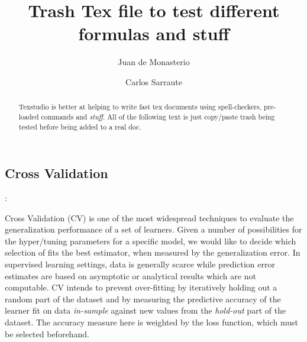 \documentclass{article}%
\theoremstyle{definition}
\begin{document}

\title{Trash Tex file to test different formulas and stuff}




\author{
Juan de Monasterio
\and Carlos Sarraute
}

%
%


\maketitle
\begin{abstract}

Texstudio is better at helping to write fast tex documents using spell-checkers, pre-loaded commands and \textit{stuff}. All of the following text is just copy/paste trash being tested before being added to a real doc.


\end{abstract}


 
 \subsection{Cross Validation}:  
 
 Cross Validation (CV) is one of the most widespread techniques to evaluate the generalization performance of a set of learners. Given a number of possibilities for the hyper/tuning parameters for a specific model, we would like to decide which selection of fits the best estimator, when measured by the generalization error. In supervised learning settings, data is generally scarce while prediction error estimates are based on asymptotic or analytical results which are not computable. CV intends to prevent over-fitting by iteratively holding out a random part of the dataset and by measuring the predictive accuracy of the learner fit on data \textit{in-sample} against new values from the \textit{hold-out} part of the dataset. The accuracy measure here is weighted by the loss function, which must be selected beforehand. 
 
\end{document}
